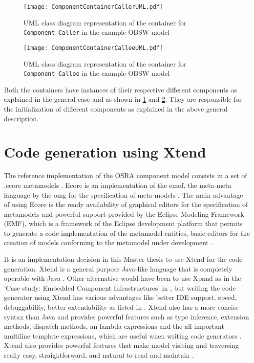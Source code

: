 \begin{figure}[h]
	\centering
	\texttt{[image: ComponentContainerCallerUML.pdf]}
	\caption{UML class diagram representation of the container for \texttt{Component\allowbreak \_Caller} in the example OBSW model}
	\label{fig: Component container caller UML}
\end{figure}

\begin{figure}[h]
	\centering
	\texttt{[image: ComponentContainerCalleeUML.pdf]}
	\caption{UML class diagram representation of the container for \texttt{Component\allowbreak \_Callee} in the example OBSW model}
	\label{fig: Component container callee UML}
\end{figure}

Both the containers have instances of their respective different components as explained in the general case and as shown in \cref{fig: Component container caller UML} and \cref{fig: Component container callee UML}. They are responsible for the initialization of different components as explained in the above general description.  

\section{Code generation using Xtend}
\label{section: code generation}
The reference implementation of the OSRA component model consists in a set of .ecore metamodels \cite{SpecMetamodel}. Ecore is an implementation of the \ac{emof}, the meta-meta language by the \ac{omg} for the specification of meta-models \cite{SpecMetamodel}. The main advantage of using Ecore is the ready availability of graphical editors for the specification of metamodels and powerful support provided by the Eclipse Modeling Framework (EMF), which is a framework of the Eclipse development platform that permits to generate a code implementation of the metamodel entities, basic editors for the creation of models conforming to the metamodel under development \cite{SpecMetamodel}. 

It is an implementation decision in this Master thesis to use Xtend for the code generation. Xtend is a general purpose Java-like language that is completely operable with Java \cite{Xtend}\cite{XtendDoc}. Other alternative would have been to use Xpand as in the 'Case study: Embedded Component Infrastructures' in \cite{MDSDBook}, but writing the code generator using Xtend has various advantages like better IDE support, speed, debuggability, better extendability as listed in \cite{XtendAdvantages}. Xtend also has a more concise syntax than Java and provides powerful features such as type inference, extension methods, dispatch methods, an lambda expressions and the all important multiline template expressions, which are useful when writing code generators \cite{Xtend}\cite{XtendDoc}. Xtend also provides powerful features that make model visiting and traversing really easy, straightforward, and natural to read and maintain \cite{XtendDoc}. 

